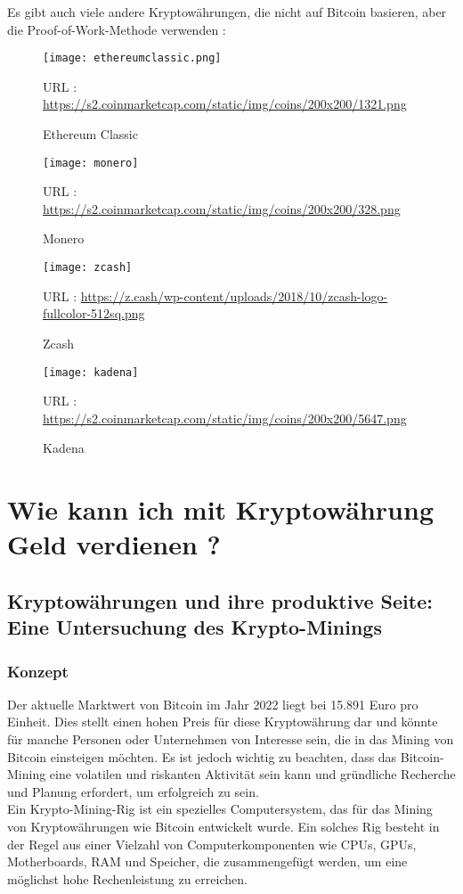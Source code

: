 \documentclass[ngerman]{scrreprt}
\begin{document}
	Es gibt auch viele andere Kryptowährungen, die nicht auf Bitcoin basieren, aber die Proof-of-Work-Methode verwenden :
	
	\begin{figure}[H]
		\centering
		\texttt{[image: ethereumclassic.png]}
		\caption{Ethereum Classic}
		\small URL : \url{https://s2.coinmarketcap.com/static/img/coins/200x200/1321.png}
	\end{figure} 
	\begin{figure}[H]
		\centering
		\texttt{[image: monero]}
		\caption{Monero}
		\small URL : \url{https://s2.coinmarketcap.com/static/img/coins/200x200/328.png}
	\end{figure} 
	\begin{figure}[H]
		\centering
		\texttt{[image: zcash]}
		\caption{Zcash}
		\small URL : \url{https://z.cash/wp-content/uploads/2018/10/zcash-logo-fullcolor-512sq.png}
	\end{figure} 
	\begin{figure}[H]
		\centering
		\texttt{[image: kadena]}
		\caption{Kadena}
		\small URL : \url{https://s2.coinmarketcap.com/static/img/coins/200x200/5647.png}
	\end{figure} 

\section{Wie kann ich mit Kryptowährung Geld verdienen ?}
\subsection{Kryptowährungen und ihre produktive Seite: Eine Untersuchung des Krypto-Minings}
\subsubsection{Konzept}
Der aktuelle Marktwert von Bitcoin im Jahr 2022 liegt bei 15.891 Euro pro Einheit. Dies stellt einen hohen Preis für diese Kryptowährung dar und könnte für manche Personen oder Unternehmen von Interesse sein, die in das Mining von Bitcoin einsteigen möchten. Es ist jedoch wichtig zu beachten, dass das Bitcoin-Mining eine volatilen und riskanten Aktivität sein kann und gründliche Recherche und Planung erfordert, um erfolgreich zu sein.  \\ 
Ein Krypto-Mining-Rig ist ein spezielles Computersystem, das für das Mining von Kryptowährungen wie Bitcoin entwickelt wurde. Ein solches Rig besteht in der Regel aus einer Vielzahl von Computerkomponenten wie CPUs, GPUs, Motherboards, RAM und Speicher, die zusammengefügt werden, um eine möglichst hohe Rechenleistung zu erreichen. \\ 
\end{document}
